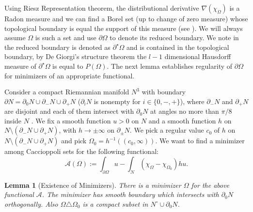 \documentclass[12pt]{amsart}
\newcommand{\p}{\partial}
\newtheorem{lemma}[theorem]{Lemma}
\numberwithin{equation}{section}
\begin{document}
	Using Riesz Representation theorem, the distributional derivative $\nabla (\chi_{\Omega})$ is a Radon measure and we can find a Borel set (up to change of zero measure) whose topological boundary is equal the support of this measure (see \cite{Maggi2012-SetsFinitePerimeter}). We will always assume $\Omega$ is such a set and use $\p \Omega$ to denote its reduced boundary. We note in \cite{Maggi2012-SetsFinitePerimeter} the reduced boundary is denoted as $\p^{\star} \Omega$ and is contained in the topological boundary, by De Giorgi's structure theorem the $l-1$ dimensional Hausdorff measure of $\p^{\star} \Omega$ is equal to $P(\Omega)$. The next lemma establishes regularity of $\p \Omega$ for minimizers of an appropriate functional. 
	



	Consider a compact Riemannian manifold $N^3$ with boundary $\partial N =\partial_0 N \cup \partial_- N \cup \partial_+ N$ ($\partial_i N$ is nonempty for $i\in\{0,-,+\}$), where $\partial_- N$ and $\partial_+ N$ are disjoint and each of them intersect with $\partial_0 N$ at angles no more than $\pi/8$ inside $N$ . We fix a smooth function $u>0$ on $N$ and a smooth function $h$ on $N\setminus (\partial_- N \cup \partial_+ N)$, with $h\rightarrow \pm\infty$ on $\partial_{\pm} N$. We pick a regular value $c_0$ of $h$ on $N\setminus (\partial_- N \cup \partial_+ N)$ and pick $\Omega_0=h^{-1}((c_0,\infty))$. We want to find a minimizer among Caccioppoli sets for the following functional:
	\begin{equation}
		\mathcal{A}(\Omega):=\int_{\partial \Omega} u-\int_N (\chi_{\Omega}-\chi_{\Omega_0})hu.
	\end{equation}


	\begin{lemma}[Existence of Minimizers]
		There is a minimizer $\Omega$ for the above functional $\mathcal{A}$. The minimizer has smooth boundary which intersects with $\partial_0 N$ orthogonally. Also $\Omega \triangle\Omega_0$ is a compact subset in $N^{\circ} \cup \partial_0 N$.
	\end{lemma}
\end{document}
